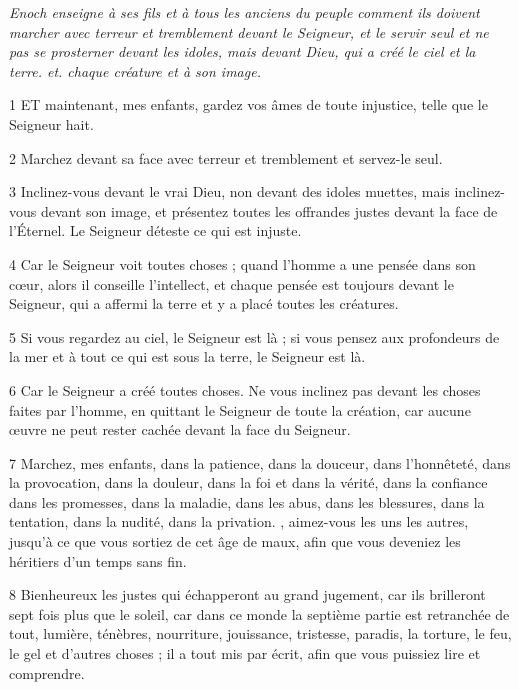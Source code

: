 
\par \textit{Enoch enseigne à ses fils et à tous les anciens du peuple comment ils doivent marcher avec terreur et tremblement devant le Seigneur, et le servir seul et ne pas se prosterner devant les idoles, mais devant Dieu, qui a créé le ciel et la terre. et. chaque créature et à son image.}

\par 1 ET maintenant, mes enfants, gardez vos âmes de toute injustice, telle que le Seigneur hait.

\par 2 Marchez devant sa face avec terreur et tremblement et servez-le seul.

\par 3 Inclinez-vous devant le vrai Dieu, non devant des idoles muettes, mais inclinez-vous devant son image, et présentez toutes les offrandes justes devant la face de l'Éternel. Le Seigneur déteste ce qui est injuste.

\par 4 Car le Seigneur voit toutes choses ; quand l'homme a une pensée dans son cœur, alors il conseille l'intellect, et chaque pensée est toujours devant le Seigneur, qui a affermi la terre et y a placé toutes les créatures.

\par 5 Si vous regardez au ciel, le Seigneur est là ; si vous pensez aux profondeurs de la mer et à tout ce qui est sous la terre, le Seigneur est là.

\par 6 Car le Seigneur a créé toutes choses. Ne vous inclinez pas devant les choses faites par l'homme, en quittant le Seigneur de toute la création, car aucune œuvre ne peut rester cachée devant la face du Seigneur.

\par 7 Marchez, mes enfants, dans la patience, dans la douceur, dans l'honnêteté, dans la provocation, dans la douleur, dans la foi et dans la vérité, dans la confiance dans les promesses, dans la maladie, dans les abus, dans les blessures, dans la tentation, dans la nudité, dans la privation. , aimez-vous les uns les autres, jusqu'à ce que vous sortiez de cet âge de maux, afin que vous deveniez les héritiers d'un temps sans fin.

\par 8 Bienheureux les justes qui échapperont au grand jugement, car ils brilleront sept fois plus que le soleil, car dans ce monde la septième partie est retranchée de tout, lumière, ténèbres, nourriture, jouissance, tristesse, paradis, la torture, le feu, le gel et d'autres choses ; il a tout mis par écrit, afin que vous puissiez lire et comprendre.

